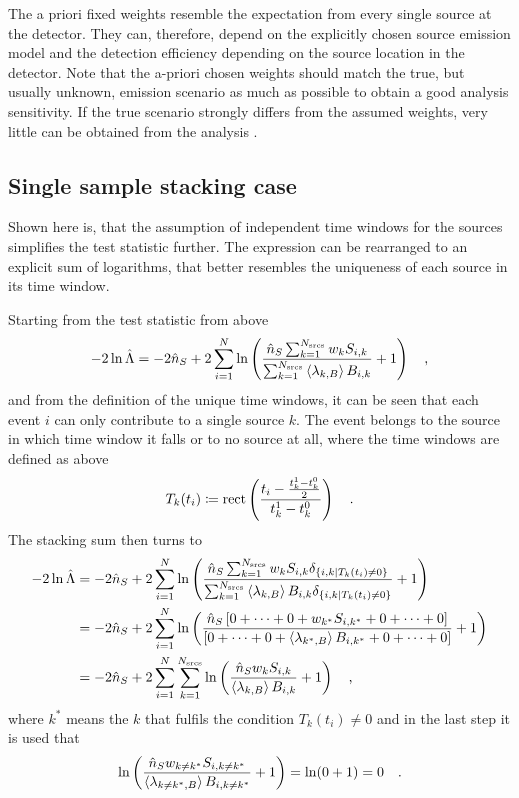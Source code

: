 The a priori fixed weights resemble the expectation from every single source at the detector.
They can, therefore, depend on the explicitly chosen source emission model and the detection efficiency depending on the source location in the detector.
Note that the a-priori chosen weights should match the true, but usually unknown, emission scenario as much as possible to obtain a good analysis sensitivity.
If the true scenario strongly differs from the assumed weights, very little can be obtained from the analysis .


\subsection{Single sample stacking case}
Shown here is, that the assumption of independent time windows for the sources simplifies the test statistic further.
The expression can be rearranged to an explicit sum of logarithms, that better resembles the uniqueness of each source in its time window.

Starting from the test statistic from above
\begin{equation}
  -2\ln\hat{\Lambda}
  = -2\hat{n}_S +
      2\sum_{i=1}^N \ln\left(
        \frac{\hat{n}_S \sum_{k=1}^{N_\text{srcs}} w_k S_{i,k}}
             {\sum_{k=1}^{N_\text{srcs}}\Braket{\lambda_{k,B}} B_{i,k}}
        + 1
      \right)
  \quad\text{,}
\end{equation}
and from the definition of the unique time windows, it can be seen that each event $i$ can only contribute to a single source $k$.
The event belongs to the source in which time window it falls or to no source at all, where the time windows are defined as above
\begin{equation}
  T_k(t_i) \coloneqq \operatorname{rect} \left(
    \frac{t_i - \frac{t_k^1-t_k^0}{2}} {t_k^1-t_k^0}
  \right)
  \quad\text{.}
\end{equation}
The stacking sum then turns to
\begin{align}
  -2\ln\hat{\Lambda}
  &= -2\hat{n}_S +
      2\sum_{i=1}^N \ln\left(
        \frac{\hat{n}_S \sum_{k=1}^{N_\text{srcs}} w_k S_{i,k}
              \delta_{\{i,k|T_k(t_i)\neq 0\}}}
             {\sum_{k=1}^{N_\text{srcs}}\Braket{\lambda_{k,B}} B_{i,k}
              \delta_{\{i,k|T_k(t_i)\neq 0\}}}
        + 1
      \right) \\
  &= -2\hat{n}_S +
      2\sum_{i=1}^N \ln\left(
        \frac{\hat{n}_S \left[0+\dots+0+ w_{k^*} S_{i,k^*} +0+\dots+0\right]}
             {\left[
              0+\dots+0+ \Braket{\lambda_{k^*,B}} B_{i,k^*} +0+\dots+0
              \right]}
        + 1
      \right) \\
  &= -2\hat{n}_S +
      2\sum_{i=1}^N \sum_{k=1}^{N_\text{srcs}} \ln\left(
        \frac{\hat{n}_S w_k S_{i,k}}{\Braket{\lambda_{k,B}} B_{i,k}}
        + 1
      \right)
  \quad\text{,}
\end{align}
where $k^*$ means the $k$ that fulfils the condition $T_k(t_i)\neq 0$ and in the last step it is used that
\begin{equation}
  \ln\left(
      \frac{\hat{n}_S w_{k\neq k^*} S_{i,k\neq k^*}}
           {\Braket{\lambda_{k\neq k^*,B}} B_{i,k\neq k^*}}
      + 1
    \right)
    = \ln(0 + 1) = 0
  \quad\text{.}
\end{equation}


